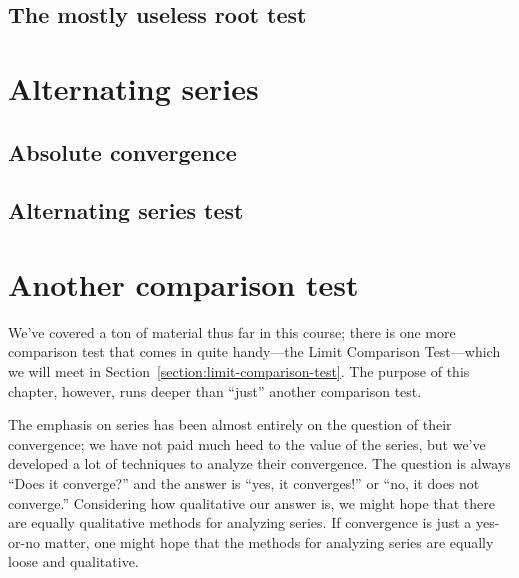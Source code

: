 \documentclass[justified]{tufte-book}
\newcommand{\xrefn}[1]{\ref{#1}}
\begin{document}
\section{The mostly useless root test}
\label{section:root-test}


\chapter{Alternating series}
\label{chapter:alternating-series}


\section{Absolute convergence}
\label{section:absolute-convergence}


\section{Alternating series test}
\label{section:alternating-series-test}


\chapter{Another comparison test}

We've covered a ton of material thus far in this course; there is one
more comparison test that comes in quite handy---the Limit Comparison
Test---which we will meet in Section~\xrefn{section:limit-comparison-test}.
The purpose of this chapter, however, runs deeper than ``just''
another comparison test.  

The emphasis on series has been almost entirely on the question of
their convergence; we have not paid much heed to the value of the
series, but we've developed a lot of techniques to analyze their
convergence.  The question is always ``Does it converge?'' and the
answer is ``yes, it converges!'' or ``no, it does not converge.''
Considering how qualitative our answer is, we might hope that there
are equally qualitative methods for analyzing series.  If convergence
is just a yes-or-no matter, one might hope that the methods for
analyzing series are equally loose and qualitative.
\end{document}
